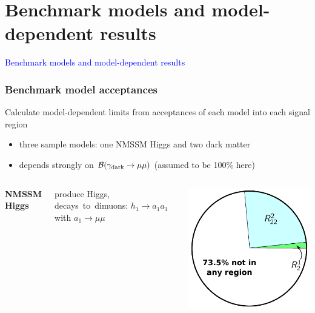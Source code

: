 \documentclass[compress]{beamer}
\newcommand{\s}[1]{{\mbox{\scriptsize #1}}}
\begin{document}
\section*{Benchmark models and model-dependent results}
\begin{frame}
\begin{center}
\Huge \textcolor{blue}{Benchmark models and model-dependent results}
\end{center}
\end{frame}

\begin{frame}
\frametitle{Benchmark model acceptances}

Calculate model-dependent limits from acceptances of each model into each signal region
\begin{itemize}
\item three sample models: one NMSSM Higgs and two dark matter
\item depends strongly on $\mathcal{B}(\gamma_\s{dark} \to \mu\mu)$ (assumed to be 100\% here)
\end{itemize}

\begin{columns}
{\bf NMSSM Higgs}

produce Higgs, \mbox{decays to dimuons:\hspace{-0.25 cm}} $h_1 \to a_1 a_1$ with $a_1 \to \mu\mu$

\includegraphics[width=\linewidth]{pie_NMSSM.pdf}


\end{columns}
\end{frame}
\end{document}
